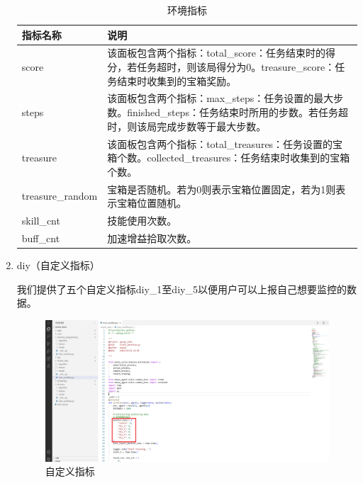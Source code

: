 \begin{enumerate}
\begin{table}[H]
    \begin{tabularx}{1\textwidth}{ l X } %
        \hline %
        \textbf{指标名称} & \textbf{说明}  \\
        \hline
        score & 该面板包含两个指标：total\_score：任务结束时的得分，若任务超时，则该局得分为0。treasure\_score：任务结束时收集到的宝箱奖励。\\
        steps & 该面板包含两个指标：max\_steps：任务设置的最大步数。finished\_steps：任务结束时所用的步数。若任务超时，则该局完成步数等于最大步数。\\
        treasure & 该面板包含两个指标：total\_treasures：任务设置的宝箱个数。collected\_treasures：任务结束时收集到的宝箱个数。\\
        treasure\_random & 宝箱是否随机。若为0则表示宝箱位置固定，若为1则表示宝箱位置随机。\\
        skill\_cnt & 技能使用次数。\\
        buff\_cnt & 加速增益拾取次数。\\
        \hline
    \end{tabularx}
    \centering
    \caption{环境指标}
    \label{monitor-env}
\end{table}

    \item diy（自定义指标）

    我们提供了五个自定义指标diy\_1至diy\_5以便用户可以上报自己想要监控的数据。

    \begin{figure}[H]
        \centering
        \includegraphics[width=1\linewidth]{pic/diy.png}
        \caption{ 自定义指标}
        \label{diy}
    \end{figure}

\end{enumerate}

